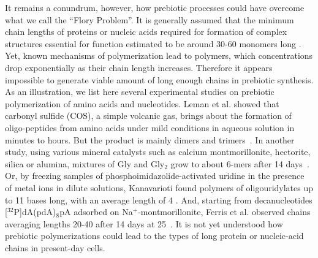\documentclass[journal=jacsat,manuscript=article,layout=twocolumn]{achemso}
\begin{document}
It remains a conundrum, however, how prebiotic processes could have overcome what we call the 
``Flory Problem''. It is generally assumed that the minimum chain lengths of proteins or nucleic 
acids required for formation of complex structures essential for function estimated to be around 
30-60 monomers long \cite{Szostak1993}. 
Yet, known mechanisms  of polymerization lead to polymers, which 
concentrations drop exponentially as their chain length increases.   
 Therefore it appears impossible to generate viable amount of long enough chains in prebiotic 
synthesis. As an illustration, we list here several experimental studies on prebiotic 
polymerization of amino acids and nucleotides. Leman et al. showed that carbonyl sulfide (COS), a 
simple volcanic gas, brings about the formation of oligo-peptides from amino acids under mild 
conditions in aqueous solution in minutes to hours. But the product is mainly dimers and 
trimers~\cite{Leman2004a}.  In another study, using various mineral catalysts such as calcium 
montmorillonite, hectorite, silica or alumina, mixtures of Gly and Gly$_2$ grow to about 6-mers 
after 14 days~\cite{Rode1997,Rode1999}.  Or, by freezing samples of phosphoimidazolide-activated 
uridine in the presence of metal ions in dilute solutions, Kanavarioti found polymers of 
oligouridylates up to 11 bases long, with an average length of 4 \cite{Kanavarioti2001}.  And, 
starting from decanucleotides [$^{32}$P]dA(pdA)$_8$pA adsorbed on Na$^+$-montmorillonite, Ferris et 
al. observed chains averaging lengths 20-40 after 14 days at 25\textcelsius\ \cite{Ferris1996}.  It 
is not yet understood how prebiotic polymerizations could lead to the types of long protein or 
nucleic-acid chains in present-day cells.

   
\end{document}
